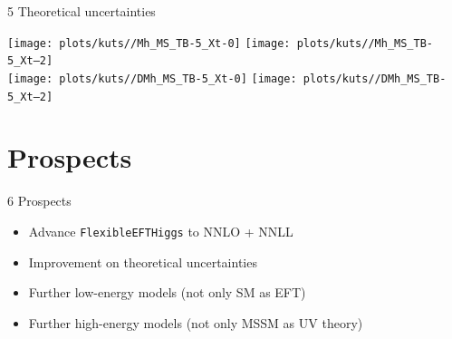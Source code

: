 \documentclass[hyperref={pdfpagelabels=false},ngerman]{beamer}
\newcommand{\feft}{\texttt{FlexibleEFTHiggs}\xspace}
\begin{document}
\begin{frame}{5 Theoretical uncertainties}
  \begin{center}
    \texttt{[image: plots/kuts//Mh\_MS\_TB-5\_Xt-0]}
    \texttt{[image: plots/kuts//Mh\_MS\_TB-5\_Xt--2]}\\
    \texttt{[image: plots/kuts//DMh\_MS\_TB-5\_Xt-0]}
    \texttt{[image: plots/kuts//DMh\_MS\_TB-5\_Xt--2]}
  \end{center}
\end{frame}

\section{Prospects}

\begin{frame}{6 Prospects}
  \begin{itemize}
  \item Advance \feft to NNLO + NNLL
  \item Improvement on theoretical uncertainties
  \item Further low-energy models (not only SM as EFT)
  \item Further high-energy models (not only MSSM as UV theory)
  \end{itemize}
\end{frame}
\end{document}
